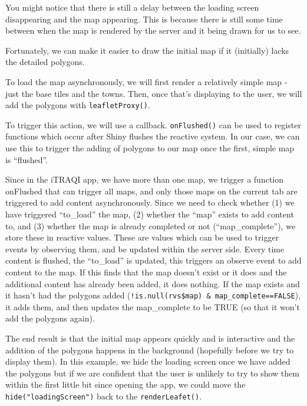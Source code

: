 \documentclass[
]{book}
\begin{document}
You might notice that there is still a delay between the loading screen disappearing and the map appearing. This is because there is still some time between when the map is rendered by the server and it being drawn for us to see.

Fortunately, we can make it easier to draw the initial map if it (initially) lacks the detailed polygons.

To load the map asynchronously, we will first render a relatively simple map - just the base tiles and the towns. Then, once that's displaying to the user, we will add the polygons with \texttt{leafletProxy()}.

To trigger this action, we will use a callback. \texttt{onFlushed()} can be used to register functions which occur after Shiny flushes the reactive system. In our case, we can use this to trigger the adding of polygons to our map once the first, simple map is ``flushed''.

Since in the iTRAQI app, we have more than one map, we trigger a function onFlushed that can trigger all maps, and only those maps on the current tab are triggered to add content asynchronously. Since we need to check whether (1) we have triggered ``to\_load'' the map, (2) whether the ``map'' exists to add content to, and (3) whether the map is already completed or not (``map\_complete''), we store these in reactive values. These are values which can be used to trigger events by observing them, and be updated within the server side. Every time content is flushed, the ``to\_load'' is updated, this triggers an observe event to add content to the map. If this finds that the map doesn't exist or it does and the additional content has already been added, it does nothing. If the map exists and it hasn't had the polygons added (\texttt{!is.null(rvs\$map)\ \&\ map\_complete==FALSE}), it adds them, and then updates the map\_complete to be TRUE (so that it won't add the polygons again).

The end result is that the initial map appears quickly and is interactive and the addition of the polygons happens in the background (hopefully before we try to display them). In this example, we hide the loading screen once we have added the polygons but if we are confident that the user is unlikely to try to show them within the first little bit since opening the app, we could move the \texttt{hide("loadingScreen")} back to the \texttt{renderLeafet()}.
\end{document}

